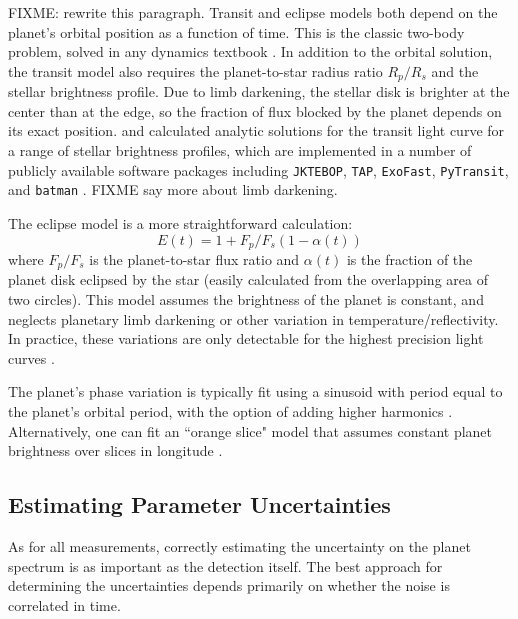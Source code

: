\documentclass[graybox,natbib,nosecnum]{svmult}
\begin{document}
FIXME: rewrite this paragraph. Transit and eclipse models both depend on the planet's orbital position as a function of time. This is the classic two-body problem, solved in any dynamics textbook \citep[e.g.][]{murray99}. In addition to the orbital solution, the transit model also requires the planet-to-star radius ratio $R_p/R_s$ and the stellar brightness profile. Due to limb darkening, the stellar disk is brighter at the center than at the edge, so the fraction of flux blocked by the planet depends on its exact position.  \cite{mandel02} and \cite{gimenez06} calculated analytic solutions for the transit light curve for a range of stellar brightness profiles,  which are implemented in a number of publicly available software packages including \texttt{JKTEBOP}, \texttt{TAP}, \texttt{ExoFast}, \texttt{PyTransit}, and \texttt{batman} \citep{southworth04, gazak12, eastman13, parviainen15, kreidberg15a}.  FIXME say more about limb darkening.

The eclipse model is a more straightforward calculation: 
\begin{equation}
E(t) = 1 + F_p/F_s (1 - \alpha(t)) 
\end{equation}
where $F_p/F_s$ is the planet-to-star flux ratio and $\alpha(t)$ is the fraction of the planet disk eclipsed by the star (easily calculated from the overlapping area of two circles). This model assumes the brightness of the planet is constant, and neglects planetary limb darkening or other variation in temperature/reflectivity. In practice, these variations are only detectable for the highest precision light curves \citep{FIXME}. 

The planet's phase variation is typically fit using a sinusoid with period equal to the planet's orbital period, with the option of adding higher harmonics \citep[e.g.][]{knutson12, stevenson16}. Alternatively, one can fit an ``orange slice" model that assumes constant planet brightness over slices in longitude \citep{knutson07, cowan08}. 

\subsection{Estimating Parameter Uncertainties}
As for all measurements, correctly estimating the uncertainty on the planet spectrum is as important as the detection itself.  The best approach for determining the uncertainties depends primarily on whether the noise is correlated in time.  
\end{document}
